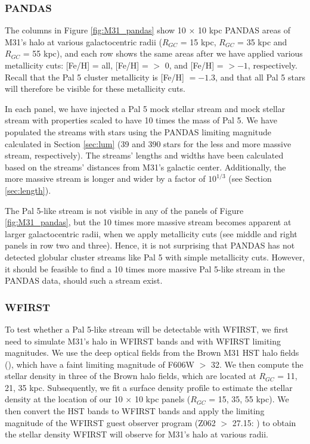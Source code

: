 \documentclass[twocolumn]{aastex62}
\begin{document}
\subsubsection{PANDAS}
\label{sec:PANDAS}
The columns in Figure \ref{fig:M31_pandas} show 10 $\times$ 10 kpc PANDAS areas of M31's halo at various galactocentric radii ($R_{GC}$ = 15  kpc, $R_{GC}$ = 35 kpc and $R_{GC}$ = 55 kpc), and each row shows the same areas after we have applied various metallicity cuts: [Fe/H] = all,  [Fe/H] = $>$ 0, and  [Fe/H] = $> -1 $, respectively. Recall that the Pal 5 cluster metallicity is  [Fe/H] $= -1.3$, and that all Pal 5 stars will therefore be visible for these metallicity cuts. 

In each panel, we have injected a Pal 5 mock stellar stream and mock stellar stream with properties scaled to have 10 times the mass of Pal 5. We have populated the streams with stars using the PANDAS limiting magnitude calculated in Section \ref{sec:lum} (39 and 390 stars for the less and more massive stream, respectively).  The streams' lengths and widths have been calculated based on the streams' distances from M31's galactic center. Additionally, the more massive stream is longer and wider by a factor of $10^{1/3}$ (see Section \ref{sec:length}). 

The Pal 5-like stream is not visible in any of the panels of Figure \ref{fig:M31_pandas}, but the 10 times more massive stream becomes apparent at larger galactocentric radii, when we apply metallicity cuts (see middle and right panels in row two and three). Hence, it is not surprising that PANDAS has not detected globular cluster streams like Pal 5 with simple metallicity cuts. However, it should be feasible to find a 10 times more massive Pal 5-like stream in the PANDAS data, should such a stream exist.

\subsubsection{WFIRST}
\label{sec:WFIRST}
To test whether a Pal 5-like stream will be detectable with WFIRST, we first need to simulate M31's halo in WFIRST bands and with WFIRST limiting magnitudes. We use the deep optical fields from the Brown M31 HST halo fields (\citealt{brown09}), which have a faint limiting magnitude of F606W $>$ 32. We then compute the stellar density in three of the Brown halo fields, which are located at $R_{GC}$ = 11, 21, 35 kpc. Subsequently, we fit a surface density profile to estimate the stellar density at the location of our 10 $\times$ 10 kpc panels ($R_{GC}$ = 15, 35, 55 kpc). We then convert the HST bands to WFIRST bands and apply the limiting magnitude of the WFIRST guest observer program (Z062 $>$ 27.15: \citealt{spergel13}) to obtain the stellar density WFIRST will observe for M31's halo at various radii.
\end{document}
